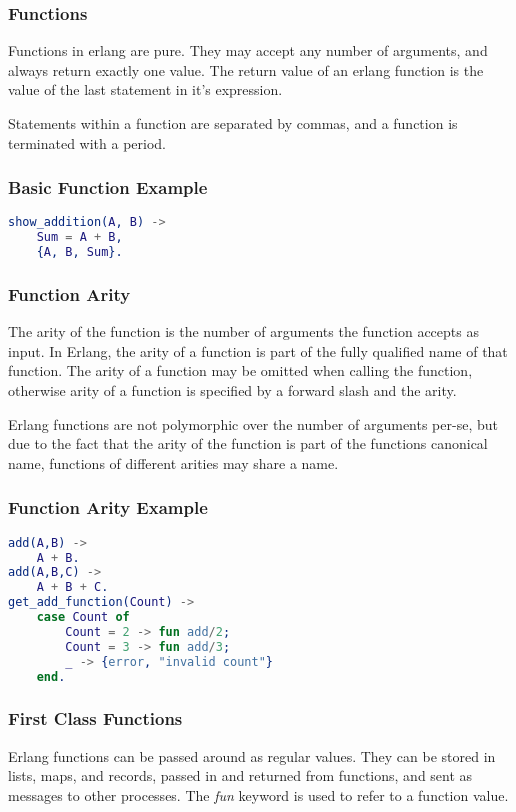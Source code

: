 \documentclass{beamer}
\begin{document}
\begin{frame}
  \frametitle{Functions}
  Functions in erlang are pure.  They may accept any number of
  arguments, and always return exactly one value.  The return value of
  an erlang function is the value of the last statement in it's
  expression.

  Statements within a function are separated by commas, and a function
  is terminated with a period.
\end{frame}

\begin{frame}[fragile]
  \frametitle{Basic Function Example}
\begin{lstlisting}[language=erlang]
show_addition(A, B) ->
    Sum = A + B,
    {A, B, Sum}.
\end{lstlisting}
\end{frame}

\begin{frame}
  \frametitle{Function Arity}
  The arity of the function is the number of arguments the function
  accepts as input.  In Erlang, the arity of a function is part of the
  fully qualified name of that function.  The arity of a function may
  be omitted when calling the function, otherwise arity of a function
  is specified by a forward slash and the arity.

  Erlang functions are not polymorphic over the number of arguments
  per-se, but due to the fact that the arity of the function is part
  of the functions canonical name, functions of different arities may
  share a name.
\end{frame}

\begin{frame}[fragile]
  \frametitle{Function Arity Example}
\begin{lstlisting}[language=erlang]
add(A,B) ->
    A + B.
add(A,B,C) ->
    A + B + C.
get_add_function(Count) ->
    case Count of
        Count = 2 -> fun add/2;
        Count = 3 -> fun add/3;
        _ -> {error, "invalid count"}
    end.
\end{lstlisting}
\end{frame}

\begin{frame}
  \frametitle{First Class Functions}
  Erlang functions can be passed around as regular values.  They can
  be stored in lists, maps, and records, passed in and returned from
  functions, and sent as messages to other processes.  The \emph{fun}
  keyword is used to refer to a function value.
\end{frame}
\end{document}
